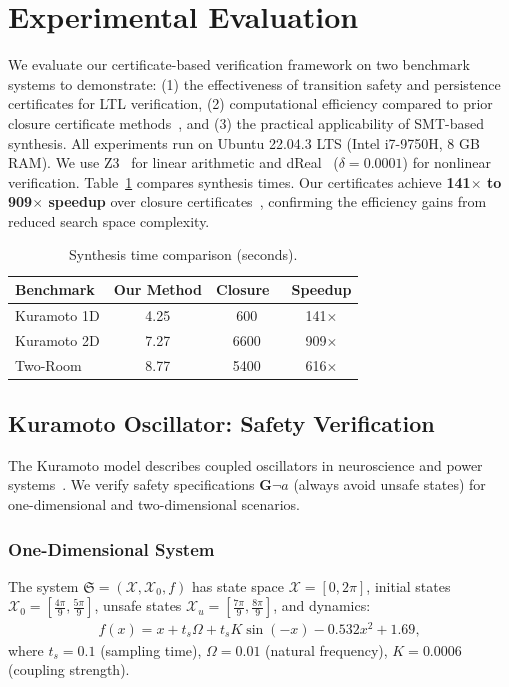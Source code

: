\section{Experimental Evaluation}
\label{sec:experiments}

We evaluate our certificate-based verification framework on two benchmark systems to demonstrate: (1) the effectiveness of transition safety and persistence certificates for LTL verification, (2) computational efficiency compared to prior closure certificate methods~\cite{murali2024closure}, and (3) the practical applicability of SMT-based synthesis. All experiments run on Ubuntu 22.04.3 LTS (Intel i7-9750H, 8 GB RAM). We use Z3~\cite{de2008z3} for linear arithmetic and dReal~\cite{gao2013dreal} ($\delta = 0.0001$) for nonlinear verification. Table~\ref{tab:results} compares synthesis times. Our certificates achieve \textbf{141$\times$ to 909$\times$ speedup} over closure certificates~\cite{murali2024closure}, confirming the efficiency gains from reduced search space complexity.
\begin{table}[h]
\centering
\caption{Synthesis time comparison (seconds).}
\label{tab:results}
\begin{tabular}{lccc}
\hline
\textbf{Benchmark} & \textbf{Our Method} & \textbf{Closure~\cite{murali2024closure}} & \textbf{Speedup} \\
\hline
Kuramoto 1D & 4.25 & 600 & 141$\times$ \\
Kuramoto 2D & 7.27 & 6600 & 909$\times$ \\
Two-Room & 8.77 & 5400 & 616$\times$ \\
\hline
\end{tabular}
\end{table}

\subsection{Kuramoto Oscillator: Safety Verification}

The Kuramoto model describes coupled oscillators in neuroscience and power systems~\cite{guo2021overviews}. We verify safety specifications $\mathbf{G}\neg a$ (always avoid unsafe states) for one-dimensional and two-dimensional scenarios.

\subsubsection{One-Dimensional System}

The system $\mathfrak{S} = (\mathcal{X}, \mathcal{X}_0, f)$ has state space $\mathcal{X} = [0, 2\pi]$, initial states $\mathcal{X}_0 = [\frac{4\pi}{9}, \frac{5\pi}{9}]$, unsafe states $\mathcal{X}_u = [\frac{7\pi}{9}, \frac{8\pi}{9}]$, and dynamics:
\begin{align}
f(x) = x + t_s\Omega + t_s K \sin(-x) - 0.532 x^2 + 1.69,
\end{align}
where $t_s = 0.1$ (sampling time), $\Omega = 0.01$ (natural frequency), $K = 0.0006$ (coupling strength).

